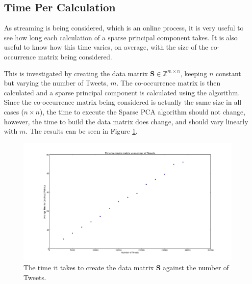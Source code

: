 \documentclass[11pt,a4paper]{article}
\newcommand{\inintmxn}{\in \mathbb{Z}^{m\times n}}
\newcommand{\smat}{\mathbf{S}}
\begin{document}

\subsection{Time Per Calculation}
As streaming is being considered, which is an online process, it is very useful to see how long each calculation of a sparse principal component takes. It is also useful to know how this time varies, on average, with the size of the co-occurrence matrix being considered.

This is investigated by creating the data matrix $\smat \inintmxn$, keeping $n$ constant but varying the number of Tweets, $m$. The co-occurrence matrix is then calculated and a sparse principal component is calculated using the algorithm. Since the co-occurrence matrix being considered is actually the same size in all cases ($n \times n$), the time to execute the Sparse PCA algorithm should not change, however, the time to build the data matrix does change, and should vary linearly with $m$. The results can be seen in Figure \ref{time_matrix_construction}.

\begin{figure}[H]
\centering
\includegraphics[scale=0.25]{Time_Matrix_Construction.png}
\caption{The time it takes to create the data matrix $\smat$ against the number of Tweets.}
\label{time_matrix_construction}
\end{figure}
\end{document}
